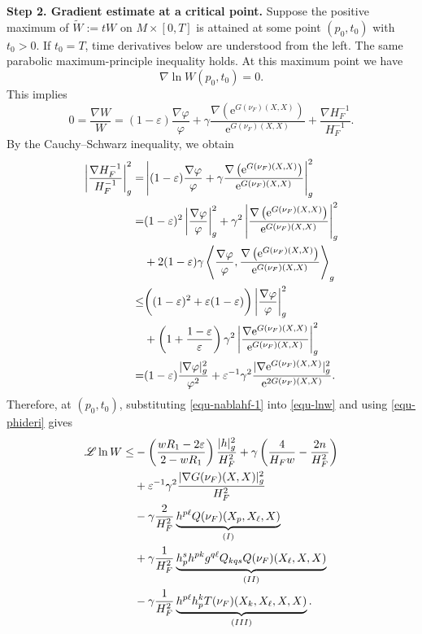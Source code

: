 \documentclass[11pt,reqno]{amsart}
\theoremstyle{definition}
\theoremstyle{remark}
\numberwithin{equation}{section}
\begin{document}
		\textbf{Step 2. Gradient estimate at a critical point.}
		Suppose the positive maximum of $\tilde{W}:=tW$ on $M\times[0,T]$ is attained at some point $(p_0,t_0)$ with $t_0>0$. If $t_0=T$, time derivatives below are understood from the left. The same parabolic maximum-principle inequality holds. At this maximum point we have
		\begin{equation*}
			\nabla \ln W(p_0,t_0)=0.
		\end{equation*}
		This implies
		\begin{equation*}
			0 = \dfrac{\nabla W}{W} = (1-\varepsilon)\dfrac{\nabla\varphi}{\varphi} + \gamma \dfrac{\nabla\left( \mathrm{e}^{G(\nu_F)(X,X)} \right)}{\mathrm{e}^{G(\nu_F)(X,X)}} + \dfrac{\nabla H_F^{-1}}{H_F^{-1}}.
		\end{equation*}
		By the Cauchy--Schwarz inequality, we obtain
		\begin{align}
			\left|\dfrac{\nabla H_F^{-1}}{H_F^{-1}}\right|^2_{g} =& \left| (1-\varepsilon)\dfrac{\nabla\varphi}{\varphi} + \gamma\dfrac{\nabla\left( \mathrm{e}^{G(\nu_F)(X,X)} \right)}{\mathrm{e}^{G(\nu_F)(X,X)}} \right|_{g}^2 \notag\\
			=& (1-\varepsilon)^2\left| \dfrac{\nabla\varphi}{\varphi} \right|_{g}^2 + \gamma^2\left| \dfrac{\nabla\left( \mathrm{e}^{G(\nu_F)(X,X)} \right)}{\mathrm{e}^{G(\nu_F)(X,X)}} \right|^2_{g} \nonumber\\
			&+ 2(1-\varepsilon)\gamma\left\langle \dfrac{\nabla\varphi}{\varphi},\dfrac{\nabla\left( \mathrm{e}^{G(\nu_F)(X,X)} \right)}{\mathrm{e}^{G(\nu_F)(X,X)}}  \right\rangle_{g} \notag\\
			\leq& \bigg( (1-\varepsilon)^2+\varepsilon(1-\varepsilon) \bigg)\left| \dfrac{\nabla\varphi}{\varphi} \right|_{g}^2 \notag\\
			&+ \left(1+\dfrac{1-\varepsilon}{\varepsilon}\right)\gamma^2\left| \dfrac{\nabla\mathrm{e}^{G(\nu_F)(X,X)}}{\mathrm{e}^{G(\nu_F)(X,X)}} \right|_{g}^2 \notag\\
			=& (1-\varepsilon)  \dfrac{|\nabla\varphi|_{g}^2}{\varphi^2} + \varepsilon^{-1}\gamma^2 \dfrac{|\nabla\mathrm{e}^{G(\nu_F)(X,X)}|_{g}^2}{\mathrm{e}^{2G(\nu_F)(X,X)}}.  \label{equ-nablahf-1}
		\end{align}
		Therefore, at $(p_0,t_0)$, substituting \eqref{equ-nablahf-1} into \eqref{equ-lnw} and using \eqref{equ-phideri} gives
		\begin{align}
			\mathscr{L} \ln W \leq& -\left( \dfrac{wR_1-2\varepsilon}{2-wR_1} \right)\dfrac{|h|_{g}^2}{H_F^2} +\gamma\left( \dfrac{4}{H_F w}-\dfrac{2n}{H_F^2} \right) \nonumber\\
			&+ \varepsilon^{-1}\gamma^2\dfrac{|\nabla G(\nu_F)(X,X)|_{g}^2}{H_F^2} \notag\\
			&- \gamma\dfrac{2}{H_F^2}\underbrace{h^{p\ell}Q(\nu_F)(X_p,X_{\ell},X)}_{(I)} \nonumber\\
			&+ \gamma\dfrac{1}{H_F^2}\underbrace{h^s_ph^{pk}g^{q\ell}Q_{kqs}Q(\nu_F)(X_{\ell},X,X)}_{(II)} \notag\\
			&- \gamma\dfrac{1}{H_F^2} \underbrace{h^{p\ell}h^k_p T(\nu_F)(X_k,X_{\ell},X,X)}_{(III)}.
			\label{12}
		\end{align}
		
\end{document}

